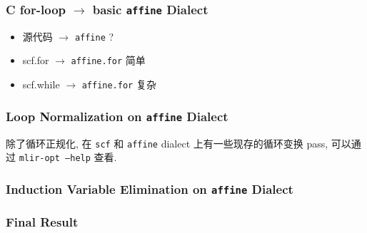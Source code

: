\documentclass[aspectratio=169]{ctexbeamer}
\begin{document}
\begin{frame}[fragile]
    \frametitle{C for-loop $\rightarrow$ basic \texttt{affine} Dialect}
    \noindent
    \begin{minipage}[t]{0.3\linewidth}
        
        \begin{itemize}
            \scriptsize
            \item 源代码 $\rightarrow$ \texttt{affine} ?
            \item scf.for $\rightarrow$ \texttt{affine.for} 简单
            \item scf.while $\rightarrow$ \texttt{affine.for} 复杂
        \end{itemize}
    \end{minipage}%
    \hfill%
    \begin{minipage}[t]{0.6\linewidth}
        
    \end{minipage}
\end{frame}

\begin{frame}[fragile]
    \frametitle{Loop Normalization on \texttt{affine} Dialect}

    \begin{minipage}[t]{0.6\linewidth}
        
    \end{minipage}%
    \hfill%
    \begin{minipage}[t]{0.4\linewidth}
        \vspace{3em}
        除了循环正规化, 在 \texttt{scf} 和 \texttt{affine} dialect 上有一些现存的循环变换 pass, 可以通过 \texttt{mlir-opt --help} 查看.
    \end{minipage}

\end{frame}

\begin{frame}[fragile]
    \frametitle{Induction Variable Elimination on \texttt{affine} Dialect}

    
\end{frame}

\begin{frame}[fragile]
    \frametitle{Final Result}

    
\end{frame}
\end{document}
